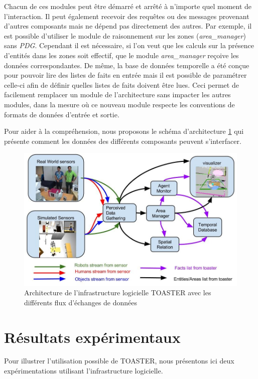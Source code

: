 \documentclass[a4paper,11pt,twoside]{StyleThese}
\begin{document}
Chacun de ces modules peut être démarré et arrêté à n'importe quel moment de l'interaction. Il peut également recevoir des requêtes ou des messages provenant d'autres composants mais ne dépend pas directement des autres. Par exemple, il est possible d'utiliser le module de raisonnement sur les zones (\textit{area\_manager}) sans \textit{PDG}. Cependant il est nécessaire, si l'on veut que les calculs sur la présence d'entités dans les zones soit effectif, que le module \textit{area\_manager} reçoive les données correspondantes.
De même, la base de données temporelle a été conçue pour pouvoir lire des listes de faits en entrée mais il est possible de paramétrer celle-ci afin de définir quelles listes de faits doivent être lues.
Ceci permet de facilement remplacer un module de l'architecture sans impacter les autres modules, dans la mesure où ce nouveau module respecte les conventions de formats de données d'entrée et sortie.

Pour aider à la compréhension, nous proposons le schéma d'architecture \ref{fig:toasterArch} qui présente comment les données des différents composants peuvent s'interfacer.


\begin{figure}[ht!]
 \centering
  \includegraphics[width=0.99\linewidth]{./img/toasterArch.jpg} 
  \caption {Architecture de l'infrastructure logicielle TOASTER avec les différents flux d'échanges de données}
  \label{fig:toasterArch}
\end{figure}

\section{Résultats expérimentaux}
Pour illustrer l'utilisation possible de TOASTER, nous présentons ici deux expérimentations utilisant l'infrastructure logicielle.
\end{document}

